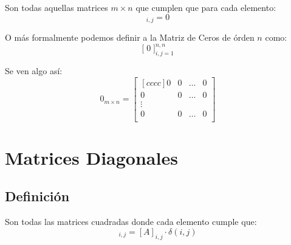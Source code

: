 \documentclass[12pt, fleqn]{report}                             %
\theoremstyle{break}                                            %
\newcommand{\BigBrackets}[1]    {\Big[ \; #1 \; \Big]}          %
\begin{document}
                Son todas aquellas matrices $m \times n$ que cumplen que para cada elemento:
                \begin{equation*}
                    [0]_{i,j} = 0
                \end{equation*}

                O más formalmente podemos definir a la Matriz de Ceros de órden $n$ como:
                \begin{equation*}
                    \BigBrackets{0}_{i, j = 1}^{n, n}
                \end{equation*}

                Se ven algo así:
                \begin{equation*}
                    0_{m \times n} =
                    \begin{bmatrix}[cccc]
                        0 & 0 & \dots & 0   \\
                        0 & 0 & \dots & 0   \\
                        \vdots              \\
                        0 & 0 & \dots & 0   \\
                    \end{bmatrix}
                \end{equation*}



        \clearpage
        \section{Matrices Diagonales}

            \subsection{Definición}

                Son todas las matrices cuadradas donde cada elemento cumple que:
                \begin{equation*}
                    [A]_{i,j} = [A]_{i,j} \cdot \delta(i,j)
                \end{equation*}
\end{document}
